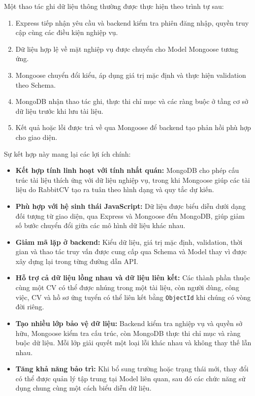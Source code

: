 \medskip
Một thao tác ghi dữ liệu thông thường được thực hiện theo trình tự sau:
\medskip

\begin{enumerate}
    \item Express tiếp nhận yêu cầu và backend kiểm tra phiên đăng nhập, quyền truy cập cùng các điều kiện nghiệp vụ.
    \item Dữ liệu hợp lệ về mặt nghiệp vụ được chuyển cho Model Mongoose tương ứng.
    \item Mongoose chuyển đổi kiểu, áp dụng giá trị mặc định và thực hiện validation theo Schema.
    \item MongoDB nhận thao tác ghi, thực thi chỉ mục và các ràng buộc ở tầng cơ sở dữ liệu trước khi lưu tài liệu.
    \item Kết quả hoặc lỗi được trả về qua Mongoose để backend tạo phản hồi phù hợp cho giao diện.
\end{enumerate}

\medskip
Sự kết hợp này mang lại các lợi ích chính:
\medskip

\begin{itemize}
    \item \textbf{Kết hợp tính linh hoạt với tính nhất quán:} MongoDB cho phép cấu trúc tài liệu thích ứng với dữ liệu nghiệp vụ, trong khi Mongoose giúp các tài liệu do RabbitCV tạo ra tuân theo hình dạng và quy tắc dự kiến.

    \item \textbf{Phù hợp với hệ sinh thái JavaScript:} Dữ liệu được biểu diễn dưới dạng đối tượng từ giao diện, qua Express và Mongoose đến MongoDB, giúp giảm số bước chuyển đổi giữa các mô hình dữ liệu khác nhau.

    \item \textbf{Giảm mã lặp ở backend:} Kiểu dữ liệu, giá trị mặc định, validation, thời gian và thao tác truy vấn được cung cấp qua Schema và Model thay vì được xây dựng lại trong từng đường dẫn API.

    \item \textbf{Hỗ trợ cả dữ liệu lồng nhau và dữ liệu liên kết:} Các thành phần thuộc cùng một CV có thể được nhúng trong một tài liệu, còn người dùng, công việc, CV và hồ sơ ứng tuyển có thể liên kết bằng \texttt{ObjectId} khi chúng có vòng đời riêng.

    \item \textbf{Tạo nhiều lớp bảo vệ dữ liệu:} Backend kiểm tra nghiệp vụ và quyền sở hữu, Mongoose kiểm tra cấu trúc, còn MongoDB thực thi chỉ mục và ràng buộc dữ liệu. Mỗi lớp giải quyết một loại lỗi khác nhau và không thay thế lẫn nhau.

    \item \textbf{Tăng khả năng bảo trì:} Khi bổ sung trường hoặc trạng thái mới, thay đổi có thể được quản lý tập trung tại Model liên quan, sau đó các chức năng sử dụng chung cùng một cách biểu diễn dữ liệu.
\end{itemize}

